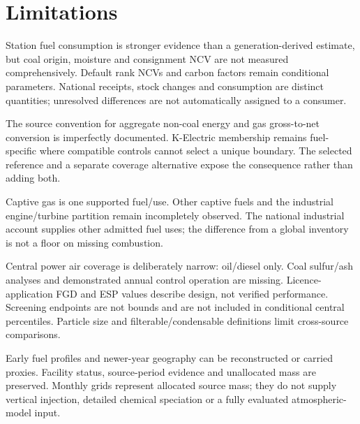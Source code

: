 \section{Limitations}
\label{sec:limitations}
Station fuel consumption is stronger evidence than a generation-derived estimate, but coal origin, moisture and consignment NCV are not measured comprehensively. Default rank NCVs and carbon factors remain conditional parameters. National receipts, stock changes and consumption are distinct quantities; unresolved differences are not automatically assigned to a consumer.

The source convention for aggregate non-coal energy and gas gross-to-net conversion is imperfectly documented. K-Electric membership remains fuel-specific where compatible controls cannot select a unique boundary. The selected reference and a separate coverage alternative expose the consequence rather than adding both.

Captive gas is one supported fuel/use. Other captive fuels and the industrial engine/turbine partition remain incompletely observed. The national industrial account supplies other admitted fuel uses; the difference from a global inventory is not a floor on missing combustion.

Central power air coverage is deliberately narrow: oil/diesel \SOtwo{} only. Coal sulfur/ash analyses and demonstrated annual control operation are missing. Licence-application FGD and ESP values describe design, not verified performance. Screening endpoints are not bounds and are not included in conditional central percentiles. Particle size and filterable/condensable definitions limit cross-source comparisons.

Early fuel profiles and newer-year geography can be reconstructed or carried proxies. Facility status, source-period evidence and unallocated mass are preserved. Monthly grids represent allocated source mass; they do not supply vertical injection, detailed chemical speciation or a fully evaluated atmospheric-model input.
